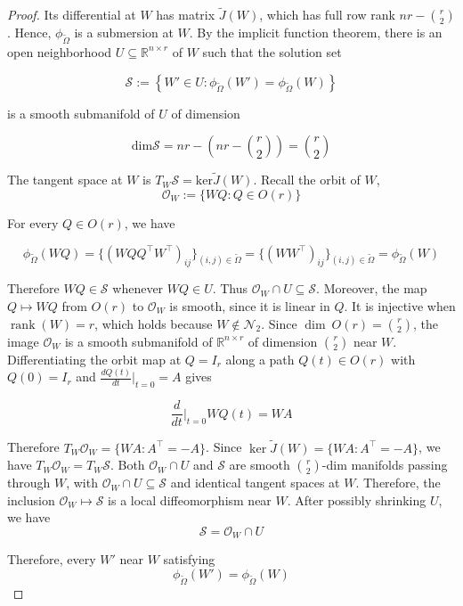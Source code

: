 \documentclass{article}
\begin{document}
\begin{proof}
Its differential at $W$ has matrix $\widetilde{J}(W)$, which has full row rank $nr - \binom{r}{2}$. Hence, $\phi_{\widetilde{\Omega}}$ is a submersion at $W$. By the implicit function theorem, there is an open neighborhood $U \subseteq \mathbb{R}^{n \times r}$ of $W$ such that the solution set

\[\mathcal{S} := \left\{ W' \in U : \phi_{\widetilde{\Omega}}(W') = \phi_{\widetilde{\Omega}}(W)\right\}\]

is a smooth submanifold of $U$ of dimension

\[ \text{dim} \mathcal{S} = nr - \left( nr - \binom{r}{2} \right) = \binom{r}{2} \]

The tangent space at $W$ is $T_{W} \mathcal{S} = \text{ker} \widetilde{J}(W)$. Recall the orbit of $W$,
\[
\mathcal{O}_W := \{ WQ : Q \in O(r) \}
\]

For every $Q \in O(r)$, we have

\[
\phi_{\widetilde{\Omega}}(WQ) = \{ (WQQ^{\top} W^{\top})_{ij} \}_{(i,j) \in \widetilde{\Omega}} = \{ (WW^{\top})_{ij} \}_{(i,j) \in \widetilde{\Omega}} = \phi_{\widetilde{\Omega}}(W)
\]

Therefore $WQ \in \mathcal{S}$ whenever $WQ \in U$. Thus $\mathcal{O}_{W} \cap U \subseteq \mathcal{S}$. Moreover, the map $Q \mapsto WQ$ from $O(r)$ to $\mathcal{O}_W$ is smooth, since it is linear in $Q$.  It is injective when $\operatorname{rank}(W) = r$, which holds because $W \not\in \mathcal{N}_2$. Since $\dim \ O(r) = \binom{r}{2}$, the image $\mathcal{O}_W$ is a smooth submanifold of $\mathbb{R}^{n\times r}$ of dimension $\binom{r}{2}$ near $W$. Differentiating the orbit map at $Q = I_r$ along a path $Q(t) \in O(r)$ with $Q(0) = I_r$ and $\frac{d Q(t)}{dt} \bigr\vert_{t=0} = A$ gives

\[
\frac{d }{dt} \bigr\vert_{t=0} WQ(t) = WA 
\]

Therefore $T_{W} \mathcal{O}_W = \{ WA : A^{\top} = -A \}$. Since $\ker \widetilde{J}(W) = \{ WA : A^{\top} = -A\}$, we have $T_W \mathcal{O}_W = T_W \mathcal{S}$. Both $\mathcal{O}_W \cap U$ and $\mathcal{S}$ are smooth $\binom{r}{2}$-dim manifolds passing through $W$, with $\mathcal{O}_W \cap U \subseteq \mathcal{S}$ and identical tangent spaces at $W$. Therefore, the inclusion $\mathcal{O}_W \mapsto \mathcal{S}$ is a local diffeomorphism near $W$. After possibly shrinking $U$, we have 
\[
\mathcal{S} = \mathcal{O}_W \cap U
\]

Therefore, every $W'$ near $W$ satisfying
\[
\phi_{\widetilde{\Omega}}(W') = \phi_{\widetilde{\Omega}}(W) 
\]


\end{proof}
\end{document}
